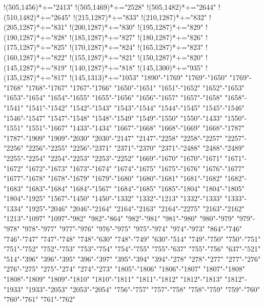 \documentclass[12pt]{amsart}
\begin{document}
{ !{(505,1456)}*+{\bullet}="2413" 
 !{(505,1469)}*+{\bullet}="2528" 
 !{(505,1482)}*+{\bullet}="2644" 
 !{(510,1482)}*+{\bullet}="2645" 
 !{(215,1287)}*+{\bullet}="833" 
 !{(210,1287)}*+{\bullet}="832" 
 !{(205,1287)}*+{\bullet}="831" 
 !{(200,1287)}*+{\bullet}="830" 
 !{(195,1287)}*+{\bullet}="829" 
 !{(190,1287)}*+{\bullet}="828" 
 !{(185,1287)}*+{\bullet}="827" 
 !{(180,1287)}*+{\bullet}="826" 
 !{(175,1287)}*+{\bullet}="825" 
 !{(170,1287)}*+{\bullet}="824" 
 !{(165,1287)}*+{\bullet}="823" 
 !{(160,1287)}*+{\bullet}="822" 
 !{(155,1287)}*+{\bullet}="821" 
 !{(150,1287)}*+{\bullet}="820" 
 !{(145,1287)}*+{\bullet}="819" 
 !{(140,1287)}*+{\bullet}="818" 
 !{(145,1300)}*+{\bullet}="935" 
 !{(135,1287)}*+{\bullet}="817" 
 !{(145,1313)}*+{\bullet}="1053" 
"1890"-"1769" 
"1769"-"1650" 
"1769"-"1768" 
"1768"-"1767" 
"1767"-"1766" 
"1650"-"1651" 
"1651"-"1652" 
"1652"-"1653" 
"1653"-"1654" 
"1654"-"1655" 
"1655"-"1656" 
"1656"-"1657" 
"1657"-"1658" 
"1658"-"1541" 
"1541"-"1542" 
"1542"-"1543" 
"1543"-"1544" 
"1544"-"1545" 
"1545"-"1546" 
"1546"-"1547" 
"1547"-"1548" 
"1548"-"1549" 
"1549"-"1550" 
"1550"-"1433" 
"1550"-"1551" 
"1551"-"1667" 
"1433"-"1434" 
"1667"-"1668" 
"1668"-"1669" 
"1668"-"1787" 
"1787"-"1909" 
"1909"-"2030" 
"2030"-"2147" 
"2147"-"2258" 
"2258"-"2257" 
"2257"-"2256" 
"2256"-"2255" 
"2256"-"2371" 
"2371"-"2370" 
"2371"-"2488" 
"2488"-"2489" 
"2255"-"2254" 
"2254"-"2253" 
"2253"-"2252" 
"1669"-"1670" 
"1670"-"1671" 
"1671"-"1672" 
"1672"-"1673" 
"1673"-"1674" 
"1674"-"1675" 
"1675"-"1676" 
"1676"-"1677" 
"1677"-"1678" 
"1678"-"1679" 
"1679"-"1680" 
"1680"-"1681" 
"1681"-"1682" 
"1682"-"1683" 
"1683"-"1684" 
"1684"-"1567" 
"1684"-"1685" 
"1685"-"1804" 
"1804"-"1805" 
"1804"-"1925" 
"1567"-"1450" 
"1450"-"1332" 
"1332"-"1213" 
"1332"-"1333" 
"1333"-"1334" 
"1925"-"2046" 
"2046"-"2164" 
"2164"-"2163" 
"2164"-"2275" 
"2163"-"2162" 
"1213"-"1097" 
"1097"-"982" 
"982"-"864" 
"982"-"981" 
"981"-"980" 
"980"-"979" 
"979"-"978" 
"978"-"977" 
"977"-"976" 
"976"-"975" 
"975"-"974" 
"974"-"973" 
"864"-"746" 
"746"-"747" 
"747"-"748" 
"748"-"630" 
"748"-"749" 
"630"-"514" 
"749"-"750" 
"750"-"751" 
"751"-"752" 
"752"-"753" 
"753"-"754" 
"754"-"755" 
"755"-"637" 
"755"-"756" 
"637"-"521" 
"514"-"396" 
"396"-"395" 
"396"-"397" 
"395"-"394" 
"394"-"278" 
"278"-"277" 
"277"-"276" 
"276"-"275" 
"275"-"274" 
"274"-"273" 
"1805"-"1806" 
"1806"-"1807" 
"1807"-"1808" 
"1808"-"1809" 
"1809"-"1810" 
"1810"-"1811" 
"1811"-"1812" 
"1812"-"1813" 
"1812"-"1933" 
"1933"-"2053" 
"2053"-"2054" 
"756"-"757" 
"757"-"758" 
"758"-"759" 
"759"-"760" 
"760"-"761" 
"761"-"762" 
}
\end{document}
